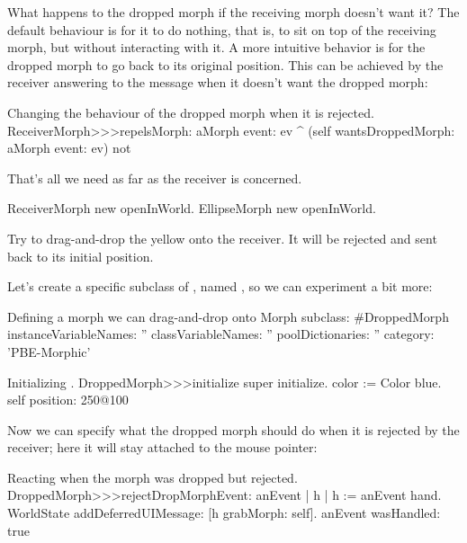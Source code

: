 \documentclass[a4paper,10pt,twoside]{book}
\begin{document}
What happens to the dropped morph if the receiving morph doesn't want it?  The default behaviour is for it to do nothing, that is, to sit on top of the receiving morph, but without interacting with it.  A more intuitive behavior is for the dropped morph to go back to its original position.  This can be achieved by the receiver answering  to the message  when it doesn't want the dropped morph:

\begin{method}{Changing the behaviour of the dropped morph when it is rejected.}
ReceiverMorph>>>repelsMorph: aMorph event: ev
	^ (self wantsDroppedMorph: aMorph event: ev) not
\end{method}

That's all we need as far as the receiver is concerned.

\begin{code}{}
ReceiverMorph new openInWorld.
EllipseMorph new openInWorld.
\end{code}
\noindent
Try to drag-and-drop the yellow  onto the receiver. It will be rejected and sent back to its initial position.


Let's create a specific subclass of , named , so we can experiment a bit more:

\begin{classdef}{Defining a morph we can drag-and-drop onto }
Morph subclass: #DroppedMorph
	instanceVariableNames: ''
	classVariableNames: ''
	poolDictionaries: ''
	category: 'PBE-Morphic'
\end{classdef}

\begin{method}{Initializing .}
DroppedMorph>>>initialize
	super initialize.
	color := Color blue.
	self position: 250@100
\end{method}

Now we can specify what the dropped morph should do when it is rejected by the receiver; here it will stay attached to the mouse pointer:
\begin{method}{Reacting when the morph was dropped but rejected.}
DroppedMorph>>>rejectDropMorphEvent: anEvent
	| h |
	h := anEvent hand.
	WorldState
		addDeferredUIMessage: [h grabMorph: self].
	anEvent wasHandled: true
\end{method}
\end{document}
